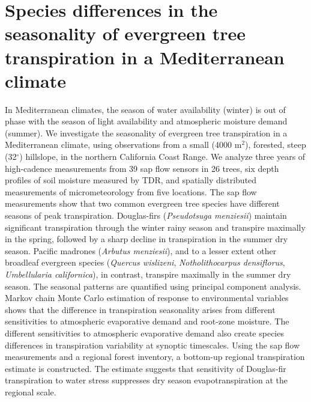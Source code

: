 \chapter{Species differences in the seasonality of evergreen tree transpiration in a Mediterranean climate}
\label{c.sapflow}

In Mediterranean climates, the season of water availability (winter) is out of phase with the season of light availability and atmospheric moisture demand (summer).  We investigate the seasonality of evergreen tree transpiration in a Mediterranean climate, using observations from a small (4000 m$^2$), forested, steep (32$^{\circ}$) hillslope, in the northern California Coast Range.  We analyze three years of high-cadence measurements from 39 sap flow sensors in 26 trees, six depth profiles of soil moisture measured by TDR, and spatially distributed measurements of micrometeorology from five locations.  The sap flow measurements show that two common evergreen tree species have different seasons of peak transpiration.  Douglas-firs (\textit{Pseudotsuga menziesii}) maintain significant transpiration through the winter rainy season and transpire maximally in the spring, followed by a sharp decline in transpiration in the summer dry season.  Pacific madrones (\textit{Arbutus menziesii}), and to a lesser extent other broadleaf evergreen species (\textit{Quercus wislizeni}, \textit{Notholithocarpus densiflorus}, \textit{Umbellularia californica}), in contrast, transpire maximally in the summer dry season. The seasonal patterns are quantified using principal component analysis.  Markov chain Monte Carlo estimation of response to environmental variables shows that the difference in transpiration seasonality arises from different sensitivities to atmospheric evaporative demand and root-zone moisture.  The different sensitivities to atmospheric evaporative demand also create species differences in transpiration variability at synoptic timescales.  Using the sap flow measurements and a regional forest inventory, a bottom-up regional transpiration estimate is constructed.  The estimate suggests that sensitivity of Douglas-fir transpiration to water stress suppresses dry season evapotranspiration at the regional scale. 









